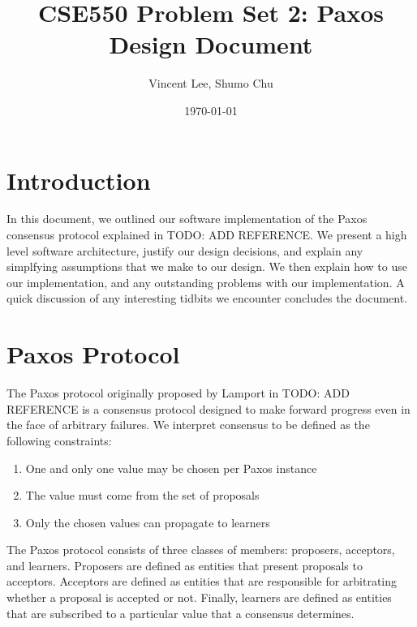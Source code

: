 \documentclass[11pt, onecolumn]{article}
\begin{document}
\title{CSE550 Problem Set 2: Paxos Design Document}
\author{Vincent Lee, Shumo Chu}
\date{\today}

\maketitle

\tableofcontents


\section{Introduction}

In this document, we outlined our software implementation of the Paxos consensus protocol explained in TODO: ADD REFERENCE.
We present a high level software architecture, justify our design decisions, and explain any simplfying assumptions that we make to our design.
We then explain how to use our implementation, and any outstanding problems with our implementation.
A quick discussion of any interesting tidbits we encounter concludes the document.


\section{Paxos Protocol}

The Paxos protocol originally proposed by Lamport in TODO: ADD REFERENCE is a consensus protocol designed to make forward progress even in the face of arbitrary failures.
We interpret consensus to be defined as the following constraints:

\begin{enumerate}
\item One and only one value may be chosen per Paxos instance
\item The value must come from the set of proposals
\item Only the chosen values can propagate to learners
\end{enumerate}

The Paxos protocol consists of three classes of members: proposers, acceptors, and learners.
Proposers are defined as entities that present proposals to acceptors.
Acceptors are defined as entities that are responsible for arbitrating whether a proposal is accepted or not.
Finally, learners are defined as entities that are subscribed to a particular value that a consensus determines.
\end{document}
